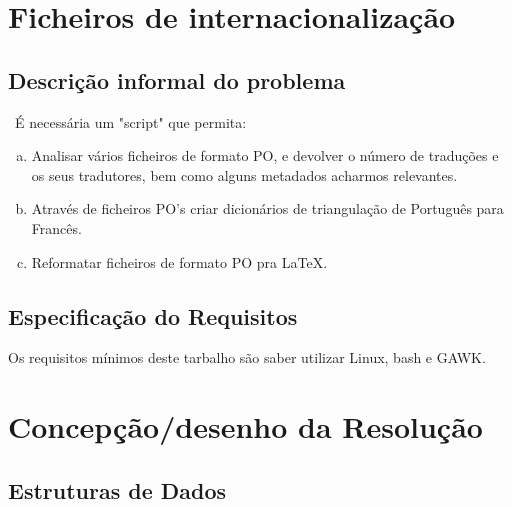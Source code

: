 \documentclass{report}
\begin{document}

\chapter{Ficheiros de internacionalização} \label{fi}

\section{Descrição informal do problema}\
É necessária um "script" que permita:
\begin{enumerate}[a)]
\item Analisar vários ficheiros de formato PO, e devolver o número de traduções
e os seus tradutores, bem como alguns metadados acharmos relevantes.
\item Através de ficheiros PO's criar dicionários de triangulação de Português
para Francês.
\item Reformatar ficheiros de formato PO pra LaTeX.
\end{enumerate}

\section{Especificação do Requisitos}
Os requisitos mínimos deste tarbalho são saber utilizar Linux, bash e GAWK.

\chapter{Concepção/desenho da Resolução}
\section{Estruturas de Dados}
\end{document}
